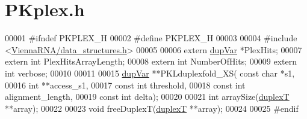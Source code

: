 \hypertarget{PKplex_8h_source}{}\section{P\+Kplex.\+h}
\label{PKplex_8h_source}

\begin{DoxyCode}
00001 \textcolor{preprocessor}{#ifndef PKPLEX\_H}
00002 \textcolor{preprocessor}{#define PKPLEX\_H}
00003 
00004 \textcolor{preprocessor}{#include <\hyperlink{data__structures_8h}{ViennaRNA/data\_structures.h}>}
00005 
00006 \textcolor{keyword}{extern} \hyperlink{group__data__structures_structdupVar}{dupVar} *PlexHits;
00007 \textcolor{keyword}{extern} \textcolor{keywordtype}{int}    PlexHitsArrayLength;
00008 \textcolor{keyword}{extern} \textcolor{keywordtype}{int}    NumberOfHits;
00009 \textcolor{keyword}{extern} \textcolor{keywordtype}{int}    verbose;
00010 
00011 
00015 \hyperlink{group__data__structures_structdupVar}{dupVar}  **PKLduplexfold\_XS( \textcolor{keyword}{const} \textcolor{keywordtype}{char} *s1,
00016                             \textcolor{keywordtype}{int} **access\_s1,
00017                             \textcolor{keyword}{const} \textcolor{keywordtype}{int} threshold,
00018                             \textcolor{keyword}{const} \textcolor{keywordtype}{int} alignment\_length,
00019                             \textcolor{keyword}{const} \textcolor{keywordtype}{int} delta);
00020 
00021 \textcolor{keywordtype}{int}     arraySize(\hyperlink{group__data__structures_structduplexT}{duplexT} **array);
00022 
00023 \textcolor{keywordtype}{void}    freeDuplexT(\hyperlink{group__data__structures_structduplexT}{duplexT} **array);
00024 
00025 \textcolor{preprocessor}{#endif}
\end{DoxyCode}
